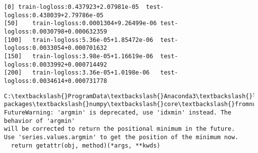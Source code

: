 \documentclass[11pt]{article}
\begin{document}
    \begin{Verbatim}[commandchars=\\\{\}]
[0]	train-logloss:0.437923+2.07981e-05	test-logloss:0.438039+2.79786e-05
[50]	train-logloss:0.0001304+9.26499e-06	test-logloss:0.0030798+0.000632359
[100]	train-logloss:5.36e-05+1.85472e-06	test-logloss:0.0033054+0.000701632
[150]	train-logloss:3.98e-05+1.16619e-06	test-logloss:0.0033992+0.000714492
[200]	train-logloss:3.36e-05+1.0198e-06	test-logloss:0.0034614+0.000731778

    \end{Verbatim}

    \begin{Verbatim}[commandchars=\\\{\}]
C:\textbackslash{}ProgramData\textbackslash{}Anaconda3\textbackslash{}lib\textbackslash{}site-packages\textbackslash{}numpy\textbackslash{}core\textbackslash{}fromnumeric.py:52: FutureWarning: 'argmin' is deprecated, use 'idxmin' instead. The behavior of 'argmin'
will be corrected to return the positional minimum in the future.
Use 'series.values.argmin' to get the position of the minimum now.
  return getattr(obj, method)(*args, **kwds)

    \end{Verbatim}
\end{document}
